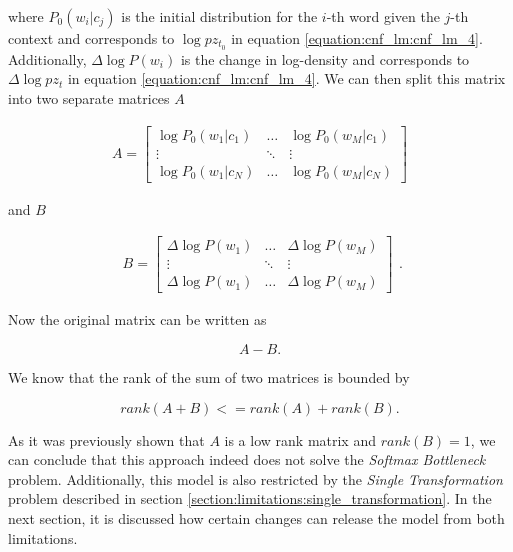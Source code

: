 where $ P_0(w_i | c_j) $ is the initial distribution for the $ i $-th word given the $ j $-th context and corresponds to $ \log pz_{t_0} $ in equation \ref{equation:cnf_lm:cnf_lm_4}. Additionally, $ \Delta \log P(w_i) $ is the change in log-density and corresponds to $ \Delta \log pz_t $ in equation \ref{equation:cnf_lm:cnf_lm_4}. We can then split this matrix into two separate matrices $ A $ 

\begin{displaymath}
    \begin{matrix}
    A = \begin{bmatrix}
       \log P_0(w_1 | c_1) & \hdots & \log P_0(w_M | c_1) \\
       \vdots & \ddots & \vdots \\
       \log P_0(w_1 | c_N) & \hdots & \log P_0(w_M | c_N)
      \end{bmatrix}
    \end{matrix}
\end{displaymath}

and $ B $

\begin{displaymath}
    \begin{matrix}
    B = \begin{bmatrix}
       \Delta \log P(w_1) & \hdots & \Delta \log P(w_M) \\
       \vdots & \ddots & \vdots \\
       \Delta \log P(w_1) & \hdots & \Delta \log P(w_M)
      \end{bmatrix}
    \end{matrix}.
\end{displaymath}

Now the original matrix can be written as

\begin{displaymath}
    A - B.
\end{displaymath}

We know that the rank of the sum of two matrices is bounded by

\begin{displaymath}
    rank(A + B) <= rank(A) + rank(B).
\end{displaymath}

As it was previously shown that $ A $ is a low rank matrix and $ rank(B) = 1 $, we can conclude that this approach indeed does not solve the \emph{Softmax Bottleneck} problem. Additionally, this model is also restricted by the \emph{Single Transformation} problem described in section \ref{section:limitations:single_transformation}. In the next section, it is discussed how certain changes can release the model from both limitations.


